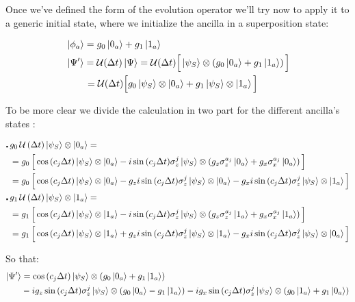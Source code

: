\documentclass[a4paper,12pt]{article}
\begin{document}
	  Once we've defined the form of the evolution operator we'll try now to apply it to a generic initial state, where we initialize the ancilla in a superposition state: 
	  
	  \begin{align}
	  	& \ket{\phi_{a}} = g_{0} \ket{0_a} + g_{1}\ket{1_a} \\
	  	& \ket{\Psi'} = \mathcal{U}(\Delta t)\ket{\Psi} = \mathcal{U}(\Delta t)\Big[ \ket{\psi_S} \otimes \left(g_{0} \ket{0_a} + g_{1}\ket{1_a} \right) \Big] \notag \\ 
	  	&\qquad = \mathcal{U}(\Delta t)\Big[ g_{0} \ket{\psi_S} \otimes \ket{0_a} + g_{1} \ket{\psi_S} \otimes \ket{1_a} \Big] \notag
	  \end{align}
	  
	  To be more clear we divide the calculation in two part for the different ancilla's states : 
	  	  
	  \begin{align}
	  	\centerdot \, &g_{0} \, \mathcal{U} \left(\Delta t\right) \ket{\psi_S} \otimes \ket{0_a} = \notag \\
	  	&= g_{0} \, \Big[\cos{\left(c_j \Delta t \right)} \ket{\psi_S} \otimes \ket{0_a} -i \sin{\left(c_j \Delta t \right)} \sigma_{z}^{j} \ket{\psi_S} \otimes \left(g_z \sigma_{z}^{a_j} \ket{0_a} + g_x \sigma_{x}^{a_j} \ket{0_a} \right) \Big] \notag \\
	  	&=g_{0} \, \Big[\cos{\left(c_j \Delta t \right)} \ket{\psi_S} \otimes \ket{0_a} - g_z i \sin{\left(c_j \Delta t \right)} \sigma_{z}^{j} \ket{\psi_S} \otimes \ket{0_a} - g_x i \sin{\left(c_j \Delta t \right)} \sigma_{z}^{j} \ket{\psi_S} \otimes \ket{1_a}\Big] \notag \\
	  	\centerdot \, &g_{1} \, \mathcal{U} \left(\Delta t\right) \ket{\psi_S} \otimes \ket{1_a} = \notag \\
	  	&= g_{1} \, \Big[\cos{\left(c_j \Delta t \right)} \ket{\psi_S} \otimes \ket{1_a} -i \sin{\left(c_j \Delta t \right)} \sigma_{z}^{j} \ket{\psi_S} \otimes \left(g_z \sigma_{z}^{a_j} \ket{1_a} + g_x \sigma_{x}^{a_j} \ket{1_a} \right) \Big] \notag \\
	  	&=g_{1} \, \Big[\cos{\left(c_j \Delta t \right)} \ket{\psi_S} \otimes \ket{1_a} + g_z i \sin{\left(c_j \Delta t \right)} \sigma_{z}^{j} \ket{\psi_S} \otimes \ket{1_a} - g_x i \sin{\left(c_j \Delta t \right)} \sigma_{z}^{j} \ket{\psi_S} \otimes \ket{0_a}\Big] \notag
	  \end{align}
	  	
	  So that:
	  \begin{align}
	  		\ket{\Psi'} &= \cos{\left(c_j \Delta t \right)} \ket{\psi_S} \otimes \left(g_0 \ket{0_a} + g_1 \ket{1_a}\right) \\
	  		& - i g_z \sin{\left(c_j \Delta t \right)} \sigma_{z}^{j} \ket{\psi_S} \otimes \left(g_0 \ket{0_a} - g_1 \ket{1_a}\right) - i g_x \sin{\left(c_j \Delta t \right)} \sigma_{z}^{j} \ket{\psi_S} \otimes \left(g_0 \ket{1_a} + g_1 \ket{0_a}\right) \notag
	  \end{align}
	  	
\end{document}
